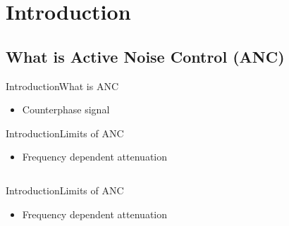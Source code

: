 \section{Introduction}
\subsection{What is Active Noise Control (ANC)}
\begin{frame}{Introduction}{What is ANC}		
	\begin{itemize}
		\item Counterphase signal
	\end{itemize}
\end{frame}





\begin{frame}{Introduction}{Limits of ANC}		
	\begin{itemize}
		\item Frequency dependent attenuation	
	\end{itemize}
	\begin{columns}
		\begin{column}{0.5\textwidth}
		\begin{center}
	 		
	 	\end{center}
		\end{column}
		\begin{column}{0.5\textwidth} 
		\begin{center}
	 		
	 	\end{center}
		\end{column}
	\end{columns}
\end{frame}



\begin{frame}{Introduction}{Limits of ANC}		
	\begin{itemize}
		\item Frequency dependent attenuation	
	\end{itemize}
	\begin{columns}
		\begin{column}{0.5\textwidth}
		\begin{center}
	 		
	 	\end{center}
		\end{column}
		\begin{column}{0.5\textwidth} 
		\begin{center}
	 		
	 	\end{center}
		\end{column}
	\end{columns}
\end{frame}





